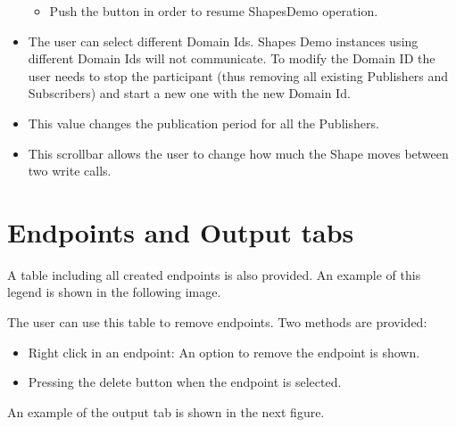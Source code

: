 \documentclass[letterpaper,10pt,english]{sphinxmanual}
\begin{document}
\begin{itemize}
\begin{itemize}
\begin{itemize}
\end{itemize}

\item {} 
Push the  button in order to resume ShapesDemo operation.

\end{itemize}

\item {} 
 The user can select different Domain Ids. Shapes Demo instances using different Domain Ids will not communicate. To modify the Domain ID the user needs to stop the participant (thus removing all existing Publishers and Subscribers) and start a new one with the new Domain Id.

\item {} 
 This value changes the publication period for all the Publishers.

\item {} 
 This scrollbar allows the user to change how much the Shape moves between two write calls.

\end{itemize}


\section{Endpoints and Output tabs}
\label{\detokenize{firststept:endpoints-and-output-tabs}}
A table including all created endpoints is also provided. An example of this legend is shown in the following image.


The user can use this table to remove endpoints. Two methods are provided:
\begin{itemize}
\item {} 
Right click in an endpoint: An option to remove the endpoint is shown.

\item {} 
Pressing the delete button when the endpoint is selected.

\end{itemize}

An example of the output tab is shown in the next figure.

\label{\detokenize{index:systemtest}}
\end{document}
